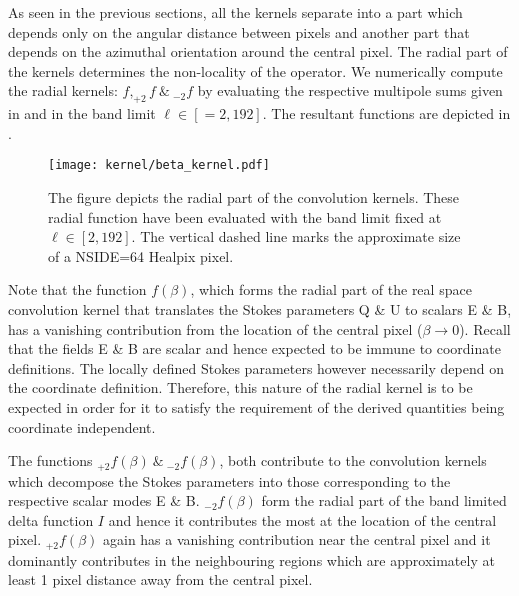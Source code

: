 As seen in the previous sections, all the kernels separate into a part which depends only on the angular distance between pixels and another part that depends on the azimuthal orientation around the central pixel. The radial part of the kernels determines the non-locality of the operator. 
We numerically compute the radial kernels: $f, _{+2}f ~\&~ _{-2}f $ by evaluating the respective multipole sums given in  and  in the band limit $\ell \in [=2,192]$. The resultant functions are depicted in . 
%
\begin{figure}[!hbt]
\centering
\texttt{[image: kernel/beta\_kernel.pdf]}
\caption{The figure depicts the radial part of the convolution kernels. These radial function have been evaluated with the band limit fixed at $\ell \in [2,192]$. The vertical dashed line marks the approximate size of a NSIDE=64 Healpix pixel.}
\label{fig:beta_kernel}
\end{figure}
%
Note that the function $f(\beta)$, which forms the radial part of the real space convolution kernel that translates the Stokes parameters Q \& U to scalars E \& B, has a vanishing contribution from the location of the central pixel ($\beta \rightarrow 0$). Recall that the fields E \& B are scalar and hence expected to be immune to coordinate definitions. The locally defined Stokes parameters however necessarily depend on the coordinate definition. Therefore, this nature of the radial kernel is to be expected in order for it to satisfy the requirement of the derived quantities being coordinate independent. 

The functions $_{+2}f(\beta)~\&~_{-2}f(\beta)$, both contribute to the convolution kernels which decompose the Stokes parameters into those corresponding to the respective scalar modes E \& B. $_{-2}f(\beta)$ form the radial part of the band limited delta function $I$ and hence it contributes the most at the location of the central pixel. $_{+2}f(\beta)$ again has a vanishing contribution near the central pixel and it dominantly contributes in the neighbouring regions which are approximately at least 1 pixel distance away from the central pixel.


